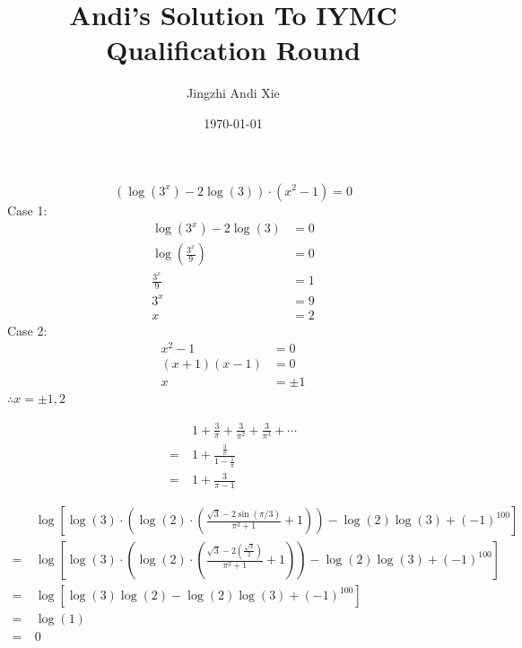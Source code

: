 \documentclass{article}
\title{Andi's Solution To IYMC Qualification Round}
\author{Jingzhi Andi Xie}
\date{\today}
\begin{document}
\maketitle


\begin{custom-big}[Problem A]
\[\left(\log\left(3^x\right)-2\log\left(3\right)\right)\cdot\left(x^2-1\right)=0\]
Case 1:
\begin{align*}
    \log\left(3^x\right)-2\log\left(3\right)&=0\\
    \log\left(\frac{3^x}{9}\right)&=0\\
    \frac{3^x}{9}&=1\\
    3^x&=9\\
    x&=2
\end{align*}
Case 2:
\begin{align*}
    x^2-1&=0\\
    \left(x+1\right)\left(x-1\right)&=0\\
    x&=\pm 1
\end{align*}
$\therefore \boxed{x=\pm 1,2}$
\end{custom-big}

\begin{custom-big}[Problem B]
\begin{align*}
    &1+\frac{3}{\pi}+\frac{3}{\pi^2}+\frac{3}{\pi^3}+\cdots\\
    =\ &1+\frac{\frac{3}{\pi}}{1-\frac{1}{\pi}}\\
    =\ &\boxed{1+\frac{3}{\pi-1}}
\end{align*}
\end{custom-big}


\begin{custom-big}[Problem C]
\begin{align*}
    &\log\left[\log\left(3\right)\cdot\left(\log\left(2\right)\cdot\left(\frac{\sqrt{3}-2\sin\left(\pi/3\right)}{\pi^3+1}+1\right)\right)-\log\left(2\right)\log\left(3\right)+\left(-1\right)^{100}\right]\\
    =\ &\log\left[\log\left(3\right)\cdot\left(\log\left(2\right)\cdot\left(\frac{\sqrt{3}-2\left(\frac{\sqrt{3}}{2}\right)}{\pi^3+1}+1\right)\right)-\log\left(2\right)\log\left(3\right)+\left(-1\right)^{100}\right]\\
    =\ &\log\left[\log\left(3\right)\log\left(2\right)-\log\left(2\right)\log\left(3\right)+\left(-1\right)^{100}\right]\\
    =\ &\log\left(1\right)\\
    =\ &\boxed{0}
\end{align*}
\end{custom-big}
\end{document}
